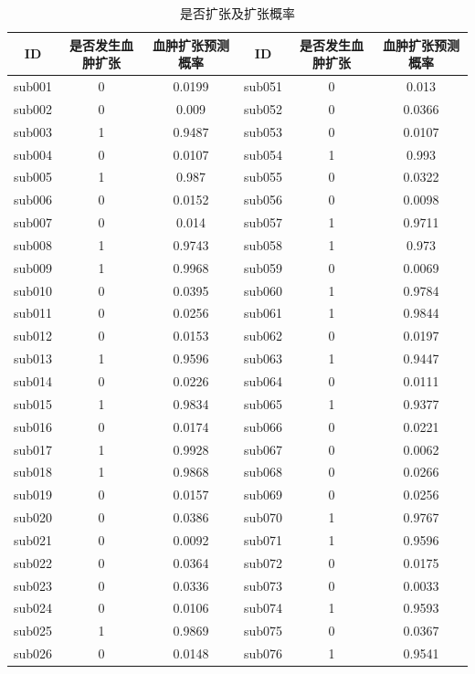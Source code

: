 \documentclass[bwprint]{gmcmthesis}
\begin{document}
\begin{table}[htbp]
  \scriptsize
  \centering
  \caption{是否扩张及扩张概率}
  \label{是否扩张及扩张概率_全表}
  \begin{tabular}{cccccc}
    \toprule
    ID & 是否发生血肿扩张 & 血肿扩张预测概率 & ID & 是否发生血肿扩张 & 血肿扩张预测概率 \\
    \midrule
    sub001 & 0 & 0.0199 & sub051 & 0 & 0.013 \\
    sub002 & 0 & 0.009 & sub052 & 0 & 0.0366 \\
    sub003 & 1 & 0.9487 & sub053 & 0 & 0.0107 \\
    sub004 & 0 & 0.0107 & sub054 & 1 & 0.993 \\
    sub005 & 1 & 0.987 & sub055 & 0 & 0.0322 \\
    sub006 & 0 & 0.0152 & sub056 & 0 & 0.0098 \\
    sub007 & 0 & 0.014 & sub057 & 1 & 0.9711 \\
    sub008 & 1 & 0.9743 & sub058 & 1 & 0.973 \\
    sub009 & 1 & 0.9968 & sub059 & 0 & 0.0069 \\
    sub010 & 0 & 0.0395 & sub060 & 1 & 0.9784 \\
    sub011 & 0 & 0.0256 & sub061 & 1 & 0.9844 \\
    sub012 & 0 & 0.0153 & sub062 & 0 & 0.0197 \\
    sub013 & 1 & 0.9596 & sub063 & 1 & 0.9447 \\
    sub014 & 0 & 0.0226 & sub064 & 0 & 0.0111 \\
    sub015 & 1 & 0.9834 & sub065 & 1 & 0.9377 \\
    sub016 & 0 & 0.0174 & sub066 & 0 & 0.0221 \\
    sub017 & 1 & 0.9928 & sub067 & 0 & 0.0062 \\
    sub018 & 1 & 0.9868 & sub068 & 0 & 0.0266 \\
    sub019 & 0 & 0.0157 & sub069 & 0 & 0.0256 \\
    sub020 & 0 & 0.0386 & sub070 & 1 & 0.9767 \\
    sub021 & 0 & 0.0092 & sub071 & 1 & 0.9596 \\
    sub022 & 0 & 0.0364 & sub072 & 0 & 0.0175 \\
    sub023 & 0 & 0.0336 & sub073 & 0 & 0.0033 \\
    sub024 & 0 & 0.0106 & sub074 & 1 & 0.9593 \\
    sub025 & 1 & 0.9869 & sub075 & 0 & 0.0367 \\
    sub026 & 0 & 0.0148 & sub076 & 1 & 0.9541 \\

\end{tabular}
\end{table}
\end{document}
